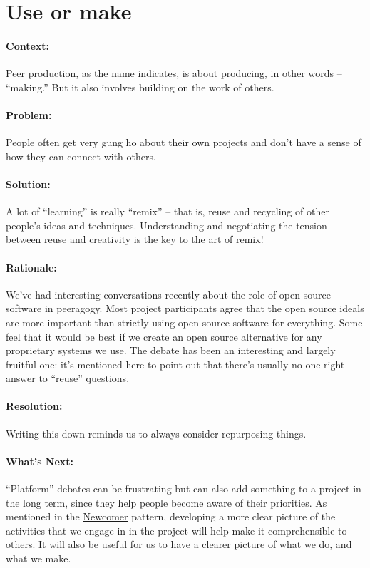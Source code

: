 \section{Use or make}
\paragraph{Context:}
Peer production, as the name indicates, is about producing, in other words --
``making.'' But it also involves building on the work of others.

\paragraph{Problem:}
People often get very gung ho about their own projects and don't have a sense of how they can connect with others.

\paragraph{Solution:} A lot of ``learning'' is really ``remix'' -- that is,
reuse and recycling of other people's ideas and techniques.
Understanding and negotiating the tension between reuse and creativity
is the key to the art of remix!

\paragraph{Rationale:} We've had interesting conversations recently about
the role of open source software in peeragogy. Most project participants
agree that the open source ideals are more important than strictly using
open source software for everything. Some feel that it would be best if
we create an open source alternative for any proprietary systems we use.
The debate has been an interesting and largely fruitful one: it's
mentioned here to point out that there's usually no one right answer to
``reuse'' questions.

\paragraph{Resolution:} Writing this down reminds us to always consider repurposing things.

\paragraph{What's Next:} ``Platform'' debates can be frustrating but can
also add something to a project in the long term, since they help people
become aware of their priorities. As mentioned in
the \href{http://peeragogy.org/patterns/newcomer/}{Newcomer} pattern,
developing a more clear picture of the activities that we engage in in
the project will help make it comprehensible to others. It will also be
useful for us to have a clearer picture of what we do, and what we make.

